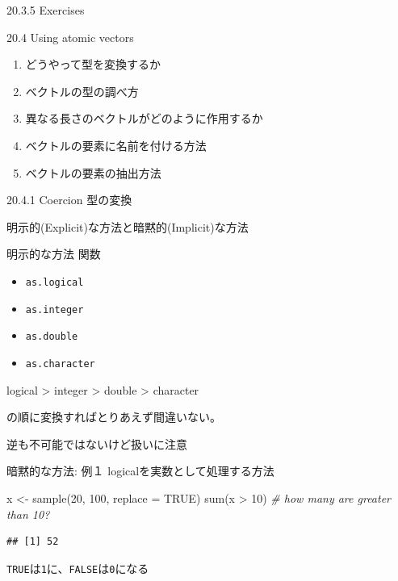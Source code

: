 \documentclass[
  ignorenonframetext,
]{beamer}
\newenvironment{Shaded}{\begin{snugshade}}{\end{snugshade}}
\newcommand{\AttributeTok}[1]{\textcolor[rgb]{0.77,0.63,0.00}{#1}}
\newcommand{\CommentTok}[1]{\textcolor[rgb]{0.56,0.35,0.01}{\textit{#1}}}
\newcommand{\ConstantTok}[1]{\textcolor[rgb]{0.00,0.00,0.00}{#1}}
\newcommand{\DecValTok}[1]{\textcolor[rgb]{0.00,0.00,0.81}{#1}}
\newcommand{\FunctionTok}[1]{\textcolor[rgb]{0.00,0.00,0.00}{#1}}
\newcommand{\NormalTok}[1]{#1}
\newcommand{\OtherTok}[1]{\textcolor[rgb]{0.56,0.35,0.01}{#1}}
\newcommand{\SpecialCharTok}[1]{\textcolor[rgb]{0.00,0.00,0.00}{#1}}
\providecommand{\tightlist}{%
  \setlength{\itemsep}{0pt}\setlength{\parskip}{0pt}}
\begin{document}
\begin{frame}{20.3.5 Exercises}
\protect\hypertarget{exercises}{}
\end{frame}

\begin{frame}{20.4 Using atomic vectors}
\protect\hypertarget{using-atomic-vectors}{}
\begin{enumerate}
\tightlist
\item
  どうやって型を変換するか
\item
  ベクトルの型の調べ方
\item
  異なる長さのベクトルがどのように作用するか
\item
  ベクトルの要素に名前を付ける方法
\item
  ベクトルの要素の抽出方法
\end{enumerate}
\end{frame}

\begin{frame}{20.4.1 Coercion}
\protect\hypertarget{coercion}{}
型の変換

明示的(Explicit)な方法と暗黙的(Implicit)な方法
\end{frame}

\begin{frame}[fragile]{明示的な方法}
\protect\hypertarget{ux660eux793aux7684ux306aux65b9ux6cd5}{}
関数

\begin{itemize}
\tightlist
\item
  \texttt{as.logical}
\item
  \texttt{as.integer}
\item
  \texttt{as.double}
\item
  \texttt{as.character}
\end{itemize}

logical \textgreater{} integer \textgreater{} double \textgreater{}
character

の順に変換すればとりあえず間違いない。

逆も不可能ではないけど扱いに注意
\end{frame}

\begin{frame}[fragile]{暗黙的な方法: 例１}
\protect\hypertarget{ux6697ux9ed9ux7684ux306aux65b9ux6cd5-ux4f8buxff11}{}
logicalを実数として処理する方法

\begin{Shaded}
\begin{Highlighting}[]
\NormalTok{x }\OtherTok{\textless{}{-}} \FunctionTok{sample}\NormalTok{(}\DecValTok{20}\NormalTok{, }\DecValTok{100}\NormalTok{, }\AttributeTok{replace =} \ConstantTok{TRUE}\NormalTok{)}
\FunctionTok{sum}\NormalTok{(x }\SpecialCharTok{\textgreater{}} \DecValTok{10}\NormalTok{)  }\CommentTok{\# how many are greater than 10?}
\end{Highlighting}
\end{Shaded}

\begin{verbatim}
## [1] 52
\end{verbatim}

\texttt{TRUE}は\texttt{1}に、\texttt{FALSE}は\texttt{0}になる
\end{frame}
\end{document}
